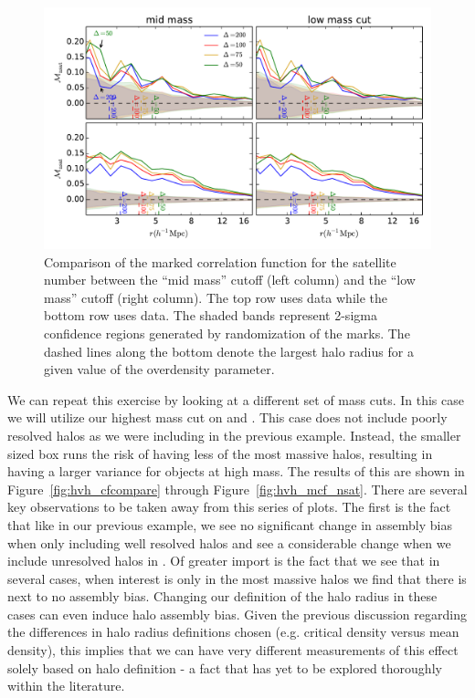 \documentclass[usenatbib,usegraphicx,letterpaper]{mn2e}
\begin{document}
\begin{figure}
	\centering
	\includegraphics[width=.9\textwidth]{all_mcf_nsat_z00_hostsvlow.pdf}
	\caption{Comparison of the marked correlation function for the satellite number between the ``mid mass'' cutoff (left column) and the ``low mass'' cutoff (right column). The top row uses \simA data while the bottom row uses \simB data. The shaded bands represent 2-sigma confidence regions generated by randomization of the marks. The dashed lines along the bottom denote the largest halo radius for a given value of the overdensity parameter.}
	\label{fig:hvl_mcf_nsat}
\end{figure}

We can repeat this exercise by looking at a different set of mass cuts. In this case we will utilize our highest mass cut on \simB and \simC. This case does not include poorly resolved halos as we were including in the previous example. Instead, the smaller sized box runs the risk of having less of the most massive halos, resulting in having a larger variance for objects at high mass. The results of this are shown in Figure~\ref{fig:hvh_cfcompare} through Figure~\ref{fig:hvh_mcf_nsat}. There are several key observations to be taken away from this series of plots. The first is the fact that like in our previous example, we see no significant change in assembly bias when only including well resolved halos and see a considerable change when we include unresolved halos in \simC. Of greater import is the fact that we see that in several cases, when interest is only in the most massive halos we find that there is next to no assembly bias. Changing our definition of the halo radius in these cases can even induce halo assembly bias. Given the previous discussion regarding the differences in halo radius definitions chosen (e.g. critical density versus mean density), this implies that we can have very different measurements of this effect solely based on halo definition - a fact that has yet to be explored thoroughly within the literature.
\end{document}
